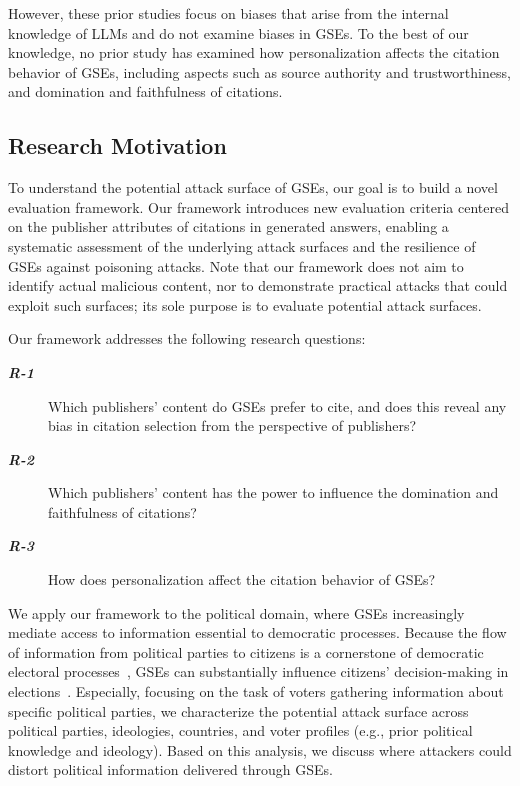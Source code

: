 However, these prior studies focus on biases that arise from the internal knowledge of LLMs and do not examine biases in GSEs. 
To the best of our knowledge, no prior study has examined how personalization affects the citation behavior of GSEs, including aspects such as source authority and trustworthiness, and domination and faithfulness of citations.

\subsection{Research Motivation}
To understand the potential attack surface of GSEs, our goal is to build a novel evaluation framework. 
Our framework introduces new evaluation criteria centered on the publisher attributes of citations in generated answers, enabling a systematic assessment of the underlying attack surfaces and the resilience of GSEs against poisoning attacks.
Note that our framework does not aim to identify actual malicious content, nor to demonstrate practical attacks that could exploit such surfaces; its sole purpose is to evaluate potential attack surfaces.

Our framework addresses the following research questions:
\begin{description}
  \item[\textbf{\textit{R-1}}] Which publishers' content do GSEs prefer to cite, and does this reveal any bias in citation selection from the perspective of publishers?
  \item[\textbf{\textit{R-2}}] Which publishers' content has the power to influence the domination and faithfulness of citations?
  \item[\textbf{\textit{R-3}}] How does personalization affect the citation behavior of GSEs?
\end{description}

We apply our framework to the political domain, where GSEs increasingly mediate access to information essential to democratic processes.
Because the flow of information from political parties to citizens is a cornerstone of democratic electoral processes~\cite{the-trust-gap-young-peoples-tactics-for-assessing-the-reliability-of-political-news-ijpp22, kovach2007elements}, GSEs can substantially influence citizens' decision-making in elections~\cite{fisher2026biasedaiinfluencepolitical}.
Especially, focusing on the task of voters gathering information about specific political parties, we characterize the potential attack surface across political parties, ideologies, countries, and voter profiles (e.g., prior political knowledge and ideology).
Based on this analysis, we discuss where attackers could distort political information delivered through GSEs.

